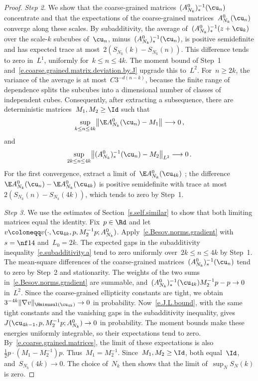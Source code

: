 \documentclass[11pt]{amsart}
\begin{document}
\begin{proof}
\smallskip

\emph{Step 2.} We show that the coarse-grained matrices~$(A_{N_k}^0)_*^{-1}(\cu_n)$ concentrate and that the expectations of the coarse-grained matrices~$A_{N_k}^0(\cu_n)$ converge along these scales. By subadditivity, the average of~$(A_{N_k}^0)_*^{-1}(z+\cu_k)$ over the scale-$k$ subcubes of~$\cu_n$, minus~$(A_{N_k}^0)_*^{-1}(\cu_n)$, is positive semidefinite and has expected trace at most~$2(S_{N_k}(k)-S_{N_k}(n))$. This difference tends to zero in~$L^1$, uniformly for~$k\leq n\leq4k$. The moment bound of Step~1 and~\eqref{e.coarse.grained.matrix.deviation.by.J} upgrade this to~$L^2$. For~$n\geq2k$, the variance of the average is at most~$C3^{-d(n-k)}$, because the finite range of dependence splits the subcubes into a dimensional number of classes of independent cubes. Consequently, after extracting a subsequence, there are deterministic matrices~$M_1,M_2\geq \Id$ such that
\begin{equation*}
	\sup_{k\leq n\leq4k}\bigl\|\E A_{N_k}^0(\cu_n)-M_1\bigr\|\longrightarrow0\,,
\end{equation*}
and
\begin{equation*}
	\sup_{2k\leq n\leq4k}\bigl\|(A_{N_k}^0)_*^{-1}(\cu_n)-M_2\bigr\|_{L^2}\longrightarrow0\,.
\end{equation*}
For the first convergence, extract a limit of~$\E A_{N_k}^0(\cu_{4k})$ ; the difference~$\E A_{N_k}^0(\cu_n)-\E A_{N_k}^0(\cu_{4k})$ is positive semidefinite with trace at most~$2(S_{N_k}(n)-S_{N_k}(4k))$, which tends to zero by Step~1.

\smallskip

\emph{Step 3.} We use the estimates of Section~\ref{s.self.similar} to show that both limiting matrices equal the identity. Fix~$p\in\Rd$ and let~$v\coloneqq v(\cdot,\cu_{4k},p,M_2^{-1}p;A_{N_k}^0)$. Apply~\eqref{e.Besov.norms.gradient} with~$s=\nf14$ and~$L_0=2k$. The expected gaps in the subadditivity inequality~\eqref{e.subadditivity.a} tend to zero uniformly over~$2k\leq n\leq4k$ by Step~1. The mean-square differences of the coarse-grained matrices~$(A_{N_k}^0)_*^{-1}(\cu_n)$ tend to zero by Step~2 and stationarity. The weights of the two sums in~\eqref{e.Besov.norms.gradient} are summable, and~$(A_{N_k}^0)_*^{-1}(\cu_{4k})M_2^{-1}p-p\to0$ in~$L^2$. Since the coarse-grained ellipticity constants are tight, we obtain~$3^{-4k}\|\nabla v\|_{\Hminusul(\cu_{4k})}\to0$ in probability. Now~\eqref{e.J.L.bound}, with the same tight constants and the vanishing gaps in the subadditivity inequality, gives~$J(\cu_{4k-1},p,M_2^{-1}p;A_{N_k}^0)\to0$ in probability. The moment bounds make these energies uniformly integrable, so their expectations tend to zero. By~\eqref{e.coarse.grained.matrices}, the limit of these expectations is also~$\frac12p\cdot(M_1-M_2^{-1})p$. Thus~$M_1=M_2^{-1}$. Since~$M_1,M_2\geq \Id$, both equal~$\Id$, and~$S_{N_k}(4k)\to0$. The choice of~$N_k$ then shows that the limit of~$\sup_NS_N(k)$ is zero.
\end{proof}
\end{document}
